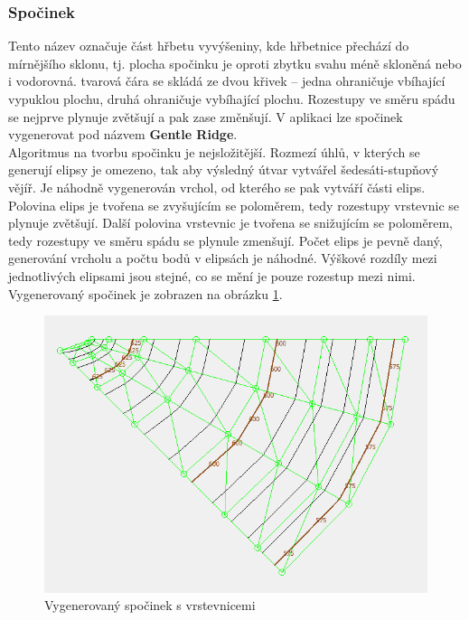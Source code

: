 \documentclass[a4paper,11pt,twoside]{article}
\begin{document}
\subsubsection{Spočinek}
Tento název označuje část hřbetu vyvýšeniny, kde hřbetnice přechází do mírnějšího sklonu, tj. plocha spočinku je oproti zbytku svahu méně skloněná nebo i vodorovná. tvarová čára se skládá ze dvou křivek -- jedna ohraničuje vbíhající vypuklou plochu, druhá ohraničuje vybíhající plochu. Rozestupy ve směru spádu se nejprve plynuje zvětšují a pak zase změnšují. V aplikaci lze spočinek vygenerovat pod názvem \textbf{Gentle Ridge}. \\
\indent Algoritmus na tvorbu spočinku je nejsložitější. Rozmezí úhlů, v kterých se generují elipsy je omezeno, tak aby výsledný útvar vytvářel šedesáti-stupňový vějíř. Je náhodně vygenerován vrchol, od kterého se pak vytváří části elips. Polovina elips je tvořena se zvyšujícím se poloměrem, tedy rozestupy vrstevnic se plynuje zvětšují. Další polovina vrstevnic je tvořena se snižujícím se poloměrem, tedy rozestupy ve směru spádu se plynule zmenšují. Počet elips je pevně daný, generování vrcholu a počtu bodů v elipsách je náhodné. Výškové rozdíly mezi jednotlivých elipsami jsou stejné, co se mění je pouze rozestup mezi nimi. Vygenerovaný spočinek je zobrazen na obrázku \ref{fig:spocinek}.

\vspace{0.2cm}
\begin{figure}[hbt!] 
\begin{center}
\includegraphics[width=13cm]{pictures/spocinek.PNG} 
\caption[Vygenerovaný spočinek s vrstevnicemi]{Vygenerovaný spočinek s vrstevnicemi}
\label{fig:spocinek}
\end{center}
\end{figure}
\end{document}
